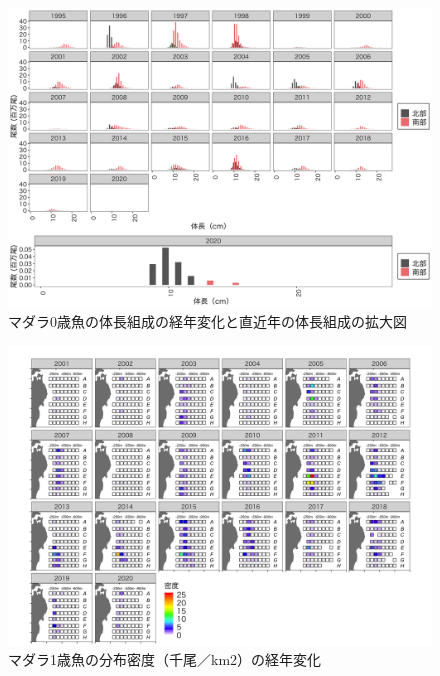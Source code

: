 \documentclass[11pt]{article} %
\begin{document}
\begin{linenumbers}
\begin{figure}[h]
  \centering
  \includegraphics[width = 14cm]{マダラ0+length.png}
  \caption{マダラ0歳魚の体長組成の経年変化と直近年の体長組成の拡大図}
\end{figure}

\begin{figure}[h]
  \centering
  \includegraphics[width = 14cm]{マダラ１＋dens.png}
  \caption{マダラ1歳魚の分布密度（千尾／km2）の経年変化}
\end{figure}


\end{linenumbers}
\end{document}

